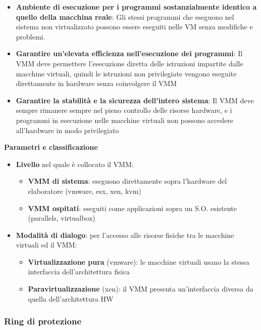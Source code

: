 \documentclass{article}
\begin{document}
\begin{itemize}
    \item \textbf{Ambiente di esecuzione per i programmi sostanzialmente identico a quello della macchina reale}: Gli stessi programmi che eseguono nel sistema non virtualizzato possono essere eseguiti nelle VM
    senza modifiche e problemi.
    \item \textbf{Garantire un'elevata efficienza nell'esecuzione dei programmi}: Il VMM deve permettere l'esecuzione diretta delle istruzioni impartite dalle macchine virtuali, quindi le istruzioni non 
    privilegiate vengono eseguite direttamente in hardware senza coinvolgere il VMM
    \item \textbf{Garantire la stabilità e la sicurezza dell'intero sistema}: Il VMM deve sempre rimanere sempre nel pieno controllo delle risorse hardware, e i programmi in  esecuzione nelle macchine virtuali non possono 
    accedere all'hardware in modo privilegiato
\end{itemize}

\textbf{Parametri e classificazione}
\begin{itemize}
    \item \textbf{Livello} nel quale è collocato il VMM:
    \begin{itemize}
        \item \textbf{VMM di sistema}: eseguono direttamente sopra l'hardware del elaboratore (vmware, esx, xen, kvm)
        \item \textbf{VMM ospitati}: eseguiti come applicazioni sopra un S.O. esistente (parallels, virtualbox)
    \end{itemize}
    \item \textbf{Modalità di dialogo}: per l'accesso alle risorse fisiche tra le macchine virtuali ed il VMM:
    \begin{itemize}
        \item \textbf{Virtualizzazione pura} (vmware): le macchine virtuali usano la stessa interfaccia dell'architettura fisica
        \item \textbf{Paravirtualizzazione} (xen): il VMM presenta un'interfaccia diversa da quella dell'architettura HW
    \end{itemize}
\end{itemize}

\subsubsection{Ring di protezione}
\end{document}
